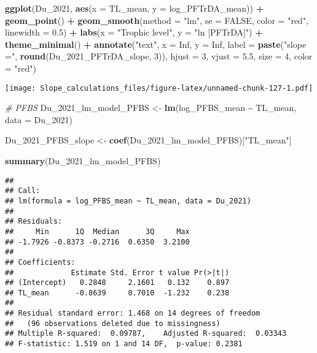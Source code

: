 \documentclass[
]{article}
\newenvironment{Shaded}{\begin{snugshade}}{\end{snugshade}}
\newcommand{\AttributeTok}[1]{\textcolor[rgb]{0.13,0.29,0.53}{#1}}
\newcommand{\CommentTok}[1]{\textcolor[rgb]{0.56,0.35,0.01}{\textit{#1}}}
\newcommand{\ConstantTok}[1]{\textcolor[rgb]{0.56,0.35,0.01}{#1}}
\newcommand{\DecValTok}[1]{\textcolor[rgb]{0.00,0.00,0.81}{#1}}
\newcommand{\FloatTok}[1]{\textcolor[rgb]{0.00,0.00,0.81}{#1}}
\newcommand{\FunctionTok}[1]{\textcolor[rgb]{0.13,0.29,0.53}{\textbf{#1}}}
\newcommand{\NormalTok}[1]{#1}
\newcommand{\OtherTok}[1]{\textcolor[rgb]{0.56,0.35,0.01}{#1}}
\newcommand{\SpecialCharTok}[1]{\textcolor[rgb]{0.81,0.36,0.00}{\textbf{#1}}}
\newcommand{\StringTok}[1]{\textcolor[rgb]{0.31,0.60,0.02}{#1}}
\begin{document}
\begin{Shaded}
\begin{Highlighting}[]
\FunctionTok{ggplot}\NormalTok{(Du\_2021, }\FunctionTok{aes}\NormalTok{(}\AttributeTok{x =}\NormalTok{ TL\_mean, }\AttributeTok{y =}\NormalTok{ log\_PFTrDA\_mean)) }\SpecialCharTok{+}
  \FunctionTok{geom\_point}\NormalTok{() }\SpecialCharTok{+}
  \FunctionTok{geom\_smooth}\NormalTok{(}\AttributeTok{method =} \StringTok{"lm"}\NormalTok{, }\AttributeTok{se =} \ConstantTok{FALSE}\NormalTok{, }\AttributeTok{color =} \StringTok{"red"}\NormalTok{, }\AttributeTok{linewidth =} \FloatTok{0.5}\NormalTok{) }\SpecialCharTok{+}
  \FunctionTok{labs}\NormalTok{(}\AttributeTok{x =} \StringTok{"Trophic level"}\NormalTok{,}
       \AttributeTok{y =} \StringTok{"ln [PFTrDA]"}\NormalTok{) }\SpecialCharTok{+}
  \FunctionTok{theme\_minimal}\NormalTok{() }\SpecialCharTok{+}
  \FunctionTok{annotate}\NormalTok{(}\StringTok{"text"}\NormalTok{, }\AttributeTok{x =} \ConstantTok{Inf}\NormalTok{, }\AttributeTok{y =} \ConstantTok{Inf}\NormalTok{, }\AttributeTok{label =} \FunctionTok{paste}\NormalTok{(}\StringTok{"slope ="}\NormalTok{, }\FunctionTok{round}\NormalTok{(Du\_2021\_PFTrDA\_slope, }\DecValTok{3}\NormalTok{)), }
           \AttributeTok{hjust =} \DecValTok{3}\NormalTok{, }\AttributeTok{vjust =} \FloatTok{5.5}\NormalTok{, }\AttributeTok{size =} \DecValTok{4}\NormalTok{, }\AttributeTok{color =} \StringTok{"red"}\NormalTok{)}
\end{Highlighting}
\end{Shaded}

\texttt{[image: Slope\_calculations\_files/figure-latex/unnamed-chunk-127-1.pdf]}

\begin{Shaded}
\begin{Highlighting}[]
\CommentTok{\# PFBS}
\NormalTok{Du\_2021\_lm\_model\_PFBS }\OtherTok{\textless{}{-}} \FunctionTok{lm}\NormalTok{(log\_PFBS\_mean }\SpecialCharTok{\textasciitilde{}}\NormalTok{ TL\_mean,}
                             \AttributeTok{data =}\NormalTok{ Du\_2021)}

\NormalTok{Du\_2021\_PFBS\_slope }\OtherTok{\textless{}{-}} \FunctionTok{coef}\NormalTok{(Du\_2021\_lm\_model\_PFBS)[}\StringTok{"TL\_mean"}\NormalTok{]}

\FunctionTok{summary}\NormalTok{(Du\_2021\_lm\_model\_PFBS)}
\end{Highlighting}
\end{Shaded}

\begin{verbatim}
## 
## Call:
## lm(formula = log_PFBS_mean ~ TL_mean, data = Du_2021)
## 
## Residuals:
##     Min      1Q  Median      3Q     Max 
## -1.7926 -0.8373 -0.2716  0.6350  3.2100 
## 
## Coefficients:
##             Estimate Std. Error t value Pr(>|t|)
## (Intercept)   0.2848     2.1601   0.132    0.897
## TL_mean      -0.8639     0.7010  -1.232    0.238
## 
## Residual standard error: 1.468 on 14 degrees of freedom
##   (96 observations deleted due to missingness)
## Multiple R-squared:  0.09787,    Adjusted R-squared:  0.03343 
## F-statistic: 1.519 on 1 and 14 DF,  p-value: 0.2381
\end{verbatim}
\end{document}
